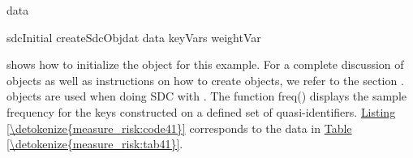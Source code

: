 \documentclass[letterpaper,10pt,english]{sphinxmanual}
\begin{document}
\begin{footnote}[5]
\begin{sphinxVerbatim}[commandchars=\\\{\}]
         
         


data       


sdcInitial  createSdcObjdat  data
keyVars      weightVar  
\end{sphinxVerbatim}
%
\end{footnote}
shows how to initialize the  object for
this example. For a complete discussion of  objects as well as
instructions on how to create  objects, we refer to
the section .
 objects are used when doing SDC with . The
function freq() displays the sample frequency for the keys constructed
on a defined set of quasi-identifiers. \hyperref[\detokenize{measure_risk:code41}]{Listing \ref{\detokenize{measure_risk:code41}}} corresponds to the
data in \hyperref[\detokenize{measure_risk:tab41}]{Table \ref{\detokenize{measure_risk:tab41}}}.
\end{document}
